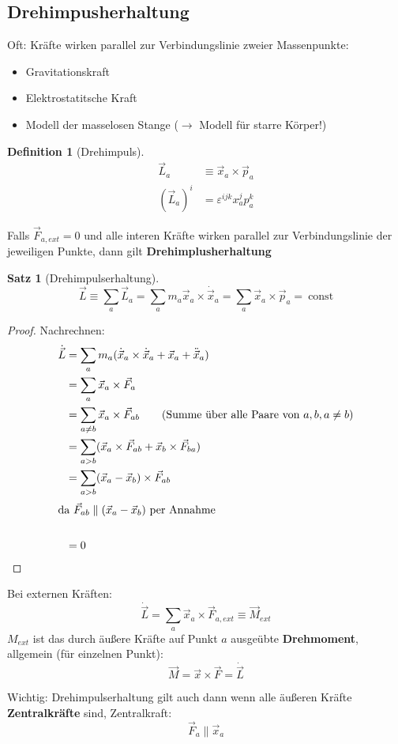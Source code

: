 \documentclass[a4paper]{scrartcl}
\renewcommand{\v}[1]{\vec{#1}}
\theoremstyle{definition}
\newtheorem{defn}{Definition}
\theoremstyle{plain}
\newtheorem{thm}{Satz}
\theoremstyle{remark}
\theoremstyle{remark}
\begin{document}
\subsection{Drehimpusherhaltung}
\label{sec-4-2}
Oft: Kräfte wirken parallel zur Verbindungslinie zweier Massenpunkte:
\begin{itemize}
\item Gravitationskraft
\item Elektrostatitsche Kraft
\item Modell der masselosen Stange ($\rightarrow$ Modell für starre Körper!)
\end{itemize}
\begin{defn}[Drehimpuls]
\begin{align*}
\v L_a &\equiv \v x_a \times \v p_a \\
(\v L_a)^i &= \varepsilon^{ijk}x_a^j p_a^k
\end{align*}
\end{defn}
Falls $\v F_{a,ext} = 0$ und alle interen Kräfte wirken parallel zur Verbindungslinie der jeweiligen Punkte, dann gilt \textbf{Drehimplusherhaltung}
\begin{thm}[Drehimpulserhaltung]
\[\v L \equiv \sum_a \v L_a = \sum_a m_a \v x_a \times \dot{\v x}_a = \sum_a \v x_a \times \v p_a = ~\text{const}\]
\end{thm}
\begin{proof}
Nachrechnen:
\begin{align*}
\dot{\v L} &= \sum_a m_a (\dot{\v x}_a \times \dot{\v x}_a + \v x_a + \ddot{\v x}_a) \\
&= \sum_a \v x_a \times \v F_a \\
&= \sum_{a\neq b} \v x_a \times \v F_{ab} \tag{Summe über alle Paare von $a,b, a\neq b$} \\
&= \sum_{a > b}(\v x_a \times \v F_{ab} + \v x_b \times \v F_{ba}) \\
&= \sum_{a > b} (\v x_a - \v x_b)\times \v F_{ab} \\
\intertext{da $\v F_{ab} \parallel (\v x_a - \v x_b)$ per Annahme} \\
&= 0 \tag*{\qedhere}
\end{align*}
\end{proof}
Bei externen Kräften:
\[\dot{\v L} = \sum_a \v x_a \times \v F_{a,ext} \equiv \v M_{ext}\]
$M_{ext}$ ist das durch äußere Kräfte auf Punkt $a$ ausgeübte \textbf{Drehmoment}, allgemein (für einzelnen Punkt):
\[\v M = \v x \times \v F = \dot{\v L}\]

Wichtig: Drehimpulserhaltung gilt auch dann wenn alle äußeren Kräfte \textbf{Zentralkräfte} sind, Zentralkraft:
\[\v F_a \parallel \v x_a\]
\end{document}
